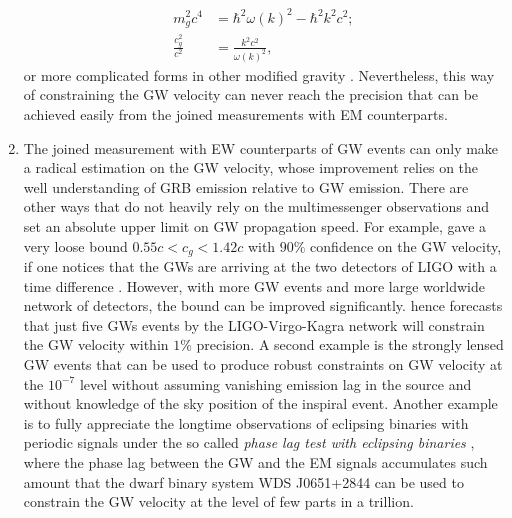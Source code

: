 \documentclass[aps,prd,twocolumn,10pt,groupedaddress]{revtex4-1}
\begin{document}
\begin{enumerate}
       \begin{align}
       m_g^2c^4&=\hbar^2\omega(k)^2-\hbar^2k^2c^2;\\
       \frac{c_g^2}{c^2}&=\frac{k^2c^2}{\omega(k)^2},
       \end{align}
       or more complicated forms in other modified gravity \cite{Abbott:2017vtc}.
       Nevertheless, this way of constraining the GW velocity can never reach the precision that can be achieved easily from the joined measurements with EM counterparts.
  \item The joined measurement with EW counterparts of GW events can only make a radical estimation on the GW velocity, whose improvement relies on the well understanding of GRB emission relative to GW emission. There are other ways that do not heavily rely on the multimessenger observations and set an absolute upper limit on GW propagation speed. For example, \cite{Cornish:2017jml} gave a very loose bound $0.55c<c_g<1.42c$ with $90\%$ confidence on the GW velocity, if one notices that the GWs are arriving at the two detectors of LIGO with a time difference \cite{Blas:2016qmn}. However, with more GW events and more large worldwide network of detectors, the bound can be improved significantly. \cite{Cornish:2017jml} hence forecasts that just five GWs events by the LIGO-Virgo-Kagra network will constrain the GW velocity within $1\%$ precision. A second example is the strongly lensed GW events \cite{Collett:2016dey} that can be used to produce robust constraints on GW velocity at the $10^{-7}$ level without assuming vanishing emission lag in the source and without knowledge of the sky position of the inspiral event. Another example is to fully appreciate the longtime observations of eclipsing binaries with periodic signals under the so called \textit{phase lag test with eclipsing binaries} \cite{Bettoni:2016mij}, where the phase lag between the GW and the EM signals accumulates such amount that the dwarf binary system WDS J0651+2844 can be used to constrain the GW velocity at the level of few parts in a trillion.
\end{enumerate}
\end{document}
